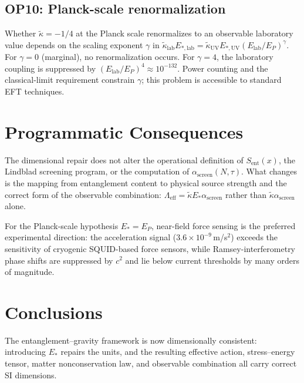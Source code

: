 \documentclass[11pt]{article}
\begin{document}
\subsection{OP10: Planck-scale renormalization}

Whether $\tilde{\kappa} = -1/4$ at the Planck scale renormalizes to an observable laboratory
value depends on the scaling exponent $\gamma$ in $\tilde{\kappa}_{\mathrm{lab}}E_{*,\mathrm{lab}}
= \tilde{\kappa}_{\mathrm{UV}}E_{*,\mathrm{UV}}(E_{\mathrm{lab}}/E_P)^\gamma$.  For $\gamma = 0$
(marginal), no renormalization occurs.  For $\gamma = 4$, the laboratory coupling is suppressed
by $(E_{\mathrm{lab}}/E_P)^4 \approx 10^{-132}$.  Power counting and the classical-limit
requirement constrain $\gamma$; this problem is accessible to standard EFT techniques.

\section{Programmatic Consequences}

The dimensional repair does not alter the operational definition of $S_{\mathrm{ent}}(x)$,
the Lindblad screening program, or the computation of $\alpha_{\mathrm{screen}}(N,\tau)$.
What changes is the mapping from entanglement content to physical source strength and the
correct form of the observable combination: $\Lambda_{\mathrm{eff}} = \tilde{\kappa}E_*\alpha_{\mathrm{screen}}$
rather than $\tilde{\kappa}\alpha_{\mathrm{screen}}$ alone.

For the Planck-scale hypothesis $E_* = E_P$, near-field force sensing is the preferred
experimental direction: the acceleration signal ($3.6\times10^{-9}$\,m/s$^2$) exceeds
the sensitivity of cryogenic SQUID-based force sensors, while Ramsey-interferometry phase
shifts are suppressed by $c^2$ and lie below current thresholds by many orders of magnitude.

\section{Conclusions}

The entanglement--gravity framework is now dimensionally consistent: introducing $E_*$ repairs the units, and the resulting effective action, stress--energy tensor, matter nonconservation law, and observable combination all carry correct SI dimensions.
\end{document}
